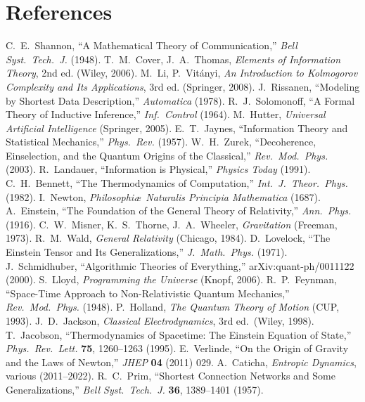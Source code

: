 \documentclass[aps,preprint,onecolumn,longbibliography,nofootinbib]{revtex4-2}
\numberwithin{equation}{section}        %
\begin{document}
\section*{References}
\begin{thebibliography}{99}

 C.~E.~Shannon, ``A Mathematical Theory of Communication,'' \emph{Bell Syst.\ Tech.\ J.} (1948).
 T.~M.~Cover, J.~A.~Thomas, \emph{Elements of Information Theory}, 2nd ed. (Wiley, 2006).
 M.~Li, P.~Vit\'anyi, \emph{An Introduction to Kolmogorov Complexity and Its Applications}, 3rd ed. (Springer, 2008).
 J.~Rissanen, ``Modeling by Shortest Data Description,'' \emph{Automatica} (1978).
 R.~J.~Solomonoff, ``A Formal Theory of Inductive Inference,'' \emph{Inf.\ Control} (1964).
 M.~Hutter, \emph{Universal Artificial Intelligence} (Springer, 2005).
 E.~T.~Jaynes, ``Information Theory and Statistical Mechanics,'' \emph{Phys.\ Rev.} (1957).
 W.~H.~Zurek, ``Decoherence, Einselection, and the Quantum Origins of the Classical,'' \emph{Rev.\ Mod.\ Phys.} (2003).
 R.~Landauer, ``Information is Physical,'' \emph{Physics Today} (1991).
 C.~H.~Bennett, ``The Thermodynamics of Computation,'' \emph{Int.\ J.\ Theor.\ Phys.} (1982).
 I.~Newton, \emph{Philosophi\ae\ Naturalis Principia Mathematica} (1687).
 A.~Einstein, ``The Foundation of the General Theory of Relativity,'' \emph{Ann.\ Phys.} (1916).
 C.~W.~Misner, K.~S.~Thorne, J.~A.~Wheeler, \emph{Gravitation} (Freeman, 1973).
 R.~M.~Wald, \emph{General Relativity} (Chicago, 1984).
 D.~Lovelock, ``The Einstein Tensor and Its Generalizations,'' \emph{J.\ Math.\ Phys.} (1971).
 J.~Schmidhuber, ``Algorithmic Theories of Everything,'' arXiv:quant-ph/0011122 (2000).
 S.~Lloyd, \emph{Programming the Universe} (Knopf, 2006).
 R.~P.~Feynman, ``Space-Time Approach to Non-Relativistic Quantum Mechanics,'' \emph{Rev.\ Mod.\ Phys.} (1948).
 P.~Holland, \emph{The Quantum Theory of Motion} (CUP, 1993).
 J.~D.~Jackson, \emph{Classical Electrodynamics}, 3rd ed.\ (Wiley, 1998).
 T.~Jacobson, ``Thermodynamics of Spacetime: The Einstein Equation of State,'' \emph{Phys.\ Rev.\ Lett.} \textbf{75}, 1260–1263 (1995).
 E.~Verlinde, ``On the Origin of Gravity and the Laws of Newton,'' \emph{JHEP} \textbf{04} (2011) 029.
 A.~Caticha, \emph{Entropic Dynamics}, various (2011–2022).
 R.~C.~Prim, ``Shortest Connection Networks and Some Generalizations,'' \emph{Bell Syst.\ Tech.\ J.} \textbf{36}, 1389–1401 (1957).

\end{thebibliography}
\end{document}
